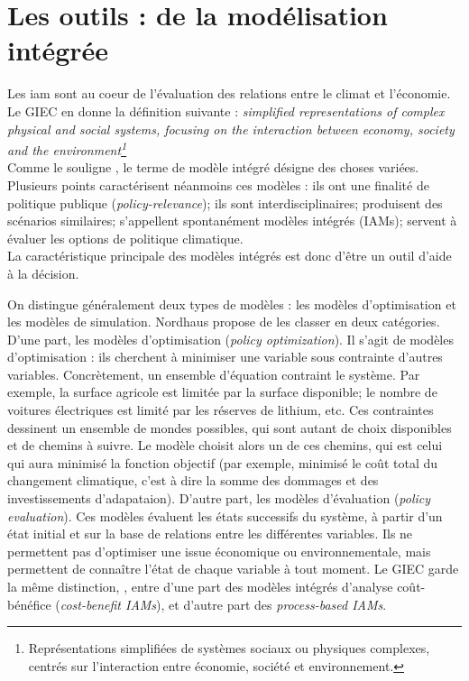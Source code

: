 \section{Les outils : de la modélisation intégrée}
\label{sect:1.3}

Les \Gls{iam} sont au coeur de l'évaluation des relations entre le climat et l'économie. Le GIEC en donne la définition suivante : \emph{{simplified representations of complex physical and social systems, focusing on the interaction between economy, society and the environment}\footnote{Représentations simplifiées de systèmes sociaux ou physiques complexes, centrés sur l'interaction entre économie, société et environnement.}}\\

Comme le souligne \cite{cointe_organising_2019}, le terme de modèle intégré désigne des choses variées. Plusieurs points caractérisent néanmoins ces modèles : ils ont une finalité de politique publique (\emph{policy-relevance}); ils sont interdisciplinaires; produisent des scénarios similaires; s'appellent spontanément modèles intégrés (IAMs); servent à évaluer les options de politique climatique. \\

La caractéristique principale des modèles intégrés est donc d'être un outil d'aide à la décision. 

On distingue généralement deux types de modèles : les modèles d'optimisation et les modèles de simulation.  
Nordhaus \cite{nordhaus_dice_2013} propose de les classer en deux catégories. D'une part, les modèles d'optimisation (\emph{policy optimization}). Il s'agit de modèles d'optimisation : ils cherchent à minimiser une variable sous contrainte d'autres variables. Concrètement, un ensemble d'équation contraint le système. Par exemple, la surface agricole est limitée par la surface disponible; le nombre de voitures électriques est limité par les réserves de lithium, etc. Ces contraintes dessinent un ensemble de mondes possibles, qui sont autant de choix disponibles et de chemins à suivre. Le modèle choisit alors un de ces chemins, qui est celui qui aura minimisé la fonction objectif (par exemple, minimisé le coût total du changement climatique, c'est à dire la somme des dommages et des investissements d'adapataion). D'autre part, les modèles d'évaluation (\emph{policy evaluation}). Ces modèles évaluent les états successifs du système, à partir d'un état initial et sur la base de relations entre les différentes variables. Ils ne permettent pas d'optimiser une issue économique ou environnementale, mais permettent de connaître l'état de chaque variable à tout moment. 
Le GIEC garde la même distinction,  \cite{intergovernmental_panel_on_climate_change_ipcc_annex_2023}, entre d'une part des modèles intégrés d'analyse coût-bénéfice (\emph{cost-benefit IAMs}), et d'autre part des \emph{process-based IAMs}.



